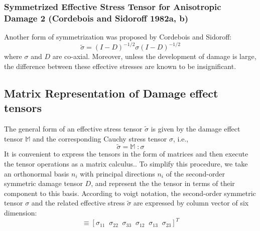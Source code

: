 \documentclass[a4paper,12pt]{extarticle}
\begin{document}
\subsubsection{Symmetrized Effective Stress Tensor for Anisotropic Damage 2 (Cordebois and Sidoroff 1982a, b)}
\indent\indent\indent Another form of symmetrization was proposed by Cordebois and Sidoroff:
\begin{equation}
\label{eqn:Cordebois and Sidoroff }
\tilde{\sigma} =  (I - D)^{-1/2}\sigma(I - D)^{-1/2}
\end{equation}
where $\sigma$ and $D$ are co-axial. Moreover, unless the development of damage is large, the difference between these effective stresses are known to be insignificant.\\

\subsection{Matrix Representation of Damage effect tensors}\label{Matrix Representation of Damage effect tensors}
\indent\indent\indent The general form of an effective stress tensor $\tilde{\sigma}$ is given by the damage effect tensor $\mathbb{M}$ and the corresponding Cauchy stress tensor $\sigma$, i.e.,
\begin{equation}
\tilde{\sigma}  = \mathbb{M} \; :  \sigma 
\label{eqn:effective_stress_tensor} 
\end{equation}
It is convenient to express the tensors in the form of matrices and then execute the tensor operations as a matrix calculus.. To simplify this procedure, we take an orthonormal basis ${n_{i}}$ with principal directions $n_{i}$ of the second-order symmetric damage tensor $D$, and represent the the tensor in terms of their component to this basis. According to voigt notation, the second-order symmetric tensor $\sigma$ and the related effective stress $\tilde{\sigma}$ are expressed by column vector of six dimension:
\begin{equation}
   [\sigma_{P}]  \equiv  [\sigma_{11} \;\; \sigma_{22} \;\;\sigma_{33} \;\;\sigma_{12} \;\;\sigma_{13} \;\;\sigma_{23} ]^{T}
\end{equation}
\end{document}
